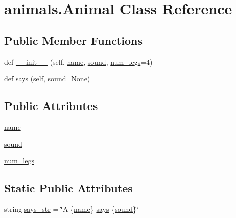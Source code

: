 \hypertarget{classanimals_1_1_animal}{}\section{animals.\+Animal Class Reference}
\label{classanimals_1_1_animal}
\subsection*{Public Member Functions}
\begin{DoxyCompactItemize}
\item 
def \hyperlink{classanimals_1_1_animal_afe25eb4fb9bc18f517cce053f1571fa9}{\+\_\+\+\_\+init\+\_\+\+\_\+} (self, \hyperlink{classanimals_1_1_animal_a644db1debd4d9d4cbf713b8adc3fa729}{name}, \hyperlink{classanimals_1_1_animal_a1d28d49e92b8c2caa3f843bb66178adc}{sound}, \hyperlink{classanimals_1_1_animal_a2774d13fb8a51a103fae0c1363579bfe}{num\+\_\+legs}=4)
\item 
def \hyperlink{classanimals_1_1_animal_a7a0b18bdcafeaba01b6c2fab8ff5f471}{says} (self, \hyperlink{classanimals_1_1_animal_a1d28d49e92b8c2caa3f843bb66178adc}{sound}=None)
\end{DoxyCompactItemize}
\subsection*{Public Attributes}
\begin{DoxyCompactItemize}
\item 
\hyperlink{classanimals_1_1_animal_a644db1debd4d9d4cbf713b8adc3fa729}{name}
\item 
\hyperlink{classanimals_1_1_animal_a1d28d49e92b8c2caa3f843bb66178adc}{sound}
\item 
\hyperlink{classanimals_1_1_animal_a2774d13fb8a51a103fae0c1363579bfe}{num\+\_\+legs}
\end{DoxyCompactItemize}
\subsection*{Static Public Attributes}
\begin{DoxyCompactItemize}
\item 
string \hyperlink{classanimals_1_1_animal_a5de0eae30200f307e56c7d18014d818a}{says\+\_\+str} = \char`\"{}A \{\hyperlink{classanimals_1_1_animal_a644db1debd4d9d4cbf713b8adc3fa729}{name}\} \hyperlink{classanimals_1_1_animal_a7a0b18bdcafeaba01b6c2fab8ff5f471}{says} \{\hyperlink{classanimals_1_1_animal_a1d28d49e92b8c2caa3f843bb66178adc}{sound}\}\char`\"{}
\end{DoxyCompactItemize}


